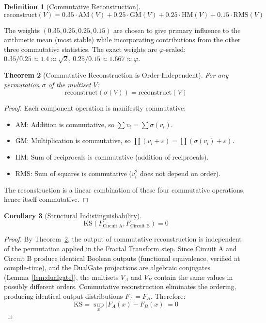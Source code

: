 \documentclass[11pt,a4paper]{article}
\newtheorem{theorem}{Theorem}[section]
\newtheorem{definition}[theorem]{Definition}
\newtheorem{corollary}[theorem]{Corollary}
\begin{document}
\begin{definition}[Commutative Reconstruction]
\begin{equation}
\text{reconstruct}(V) = 0.35 \cdot \text{AM}(V) + 0.25 \cdot \text{GM}(V) + 0.25 \cdot \text{HM}(V) + 0.15 \cdot \text{RMS}(V) \label{eq:reconstruct}
\end{equation}
\end{definition}

The weights $(0.35, 0.25, 0.25, 0.15)$ are chosen to give primary influence to the arithmetic mean (most stable) while incorporating contributions from the other three commutative statistics. The exact weights are $\varphi$-scaled: $0.35/0.25 \approx 1.4 \approx \sqrt{2}$, $0.25/0.15 \approx 1.667 \approx \varphi$.

\begin{theorem}[Commutative Reconstruction is Order-Independent]\label{thm:commutative}
For any permutation $\sigma$ of the multiset $V$:
\begin{equation}
\text{reconstruct}(\sigma(V)) = \text{reconstruct}(V)
\end{equation}
\end{theorem}

\begin{proof}
Each component operation is manifestly commutative:
\begin{itemize}[nosep]
    \item AM: Addition is commutative, so $\sum v_i = \sum \sigma(v_i)$.
    \item GM: Multiplication is commutative, so $\prod(v_i + \varepsilon) = \prod(\sigma(v_i) + \varepsilon)$.
    \item HM: Sum of reciprocals is commutative (addition of reciprocals).
    \item RMS: Sum of squares is commutative ($v_i^2$ does not depend on order).
\end{itemize}
The reconstruction is a linear combination of these four commutative operations, hence itself commutative.
\end{proof}

\begin{corollary}[Structural Indistinguishability]
\begin{equation}
\text{KS}(F_{\text{Circuit A}}, F_{\text{Circuit B}}) = 0
\end{equation}
\end{corollary}

\begin{proof}
By Theorem~\ref{thm:commutative}, the output of commutative reconstruction is independent of the permutation applied in the Fractal Transform step. Since Circuit A and Circuit B produce identical Boolean outputs (functional equivalence, verified at compile-time), and the DualGate projections are algebraic conjugates (Lemma~\ref{lem:dualgate}), the multisets $V_A$ and $V_B$ contain the same values in possibly different orders. Commutative reconstruction eliminates the ordering, producing identical output distributions $F_A = F_B$. Therefore:
\begin{equation}
\text{KS} = \sup_x |F_A(x) - F_B(x)| = 0
\end{equation}
\end{proof}
\end{document}
